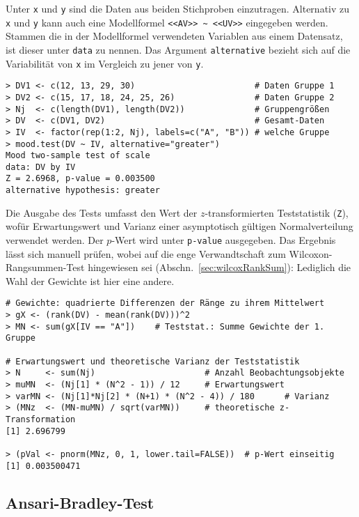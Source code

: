 Unter \lstinline!x! und \lstinline!y! sind die Daten aus beiden Stichproben einzutragen. Alternativ zu \lstinline!x! und \lstinline!y! kann auch eine Modellformel \lstinline!<<AV>> ~ <<UV>>! eingegeben werden. Stammen die in der Modellformel verwendeten Variablen aus einem Datensatz, ist dieser unter \lstinline!data! zu nennen. Das Argument \lstinline!alternative! bezieht sich auf die Variabilität von \lstinline!x! im Vergleich zu jener von \lstinline!y!.

\begin{lstlisting}
> DV1 <- c(12, 13, 29, 30)                        # Daten Gruppe 1
> DV2 <- c(15, 17, 18, 24, 25, 26)                # Daten Gruppe 2
> Nj  <- c(length(DV1), length(DV2))              # Gruppengrößen
> DV  <- c(DV1, DV2)                              # Gesamt-Daten
> IV  <- factor(rep(1:2, Nj), labels=c("A", "B")) # welche Gruppe
> mood.test(DV ~ IV, alternative="greater")
Mood two-sample test of scale
data: DV by IV
Z = 2.6968, p-value = 0.003500
alternative hypothesis: greater
\end{lstlisting}

Die Ausgabe des Tests umfasst den Wert der $z$-transformierten Teststatistik (\lstinline!Z!), wofür Erwartungswert und Varianz einer asymptotisch gültigen Normalverteilung verwendet werden. Der $p$-Wert wird unter \lstinline!p-value! ausgegeben. Das Ergebnis lässt sich manuell prüfen, wobei auf die enge Verwandtschaft zum Wilcoxon-Rangsummen-Test hingewiesen sei (Abschn.\ \ref{sec:wilcoxRankSum}): Lediglich die Wahl der Gewichte ist hier eine andere.
\begin{lstlisting}
# Gewichte: quadrierte Differenzen der Ränge zu ihrem Mittelwert
> gX <- (rank(DV) - mean(rank(DV)))^2
> MN <- sum(gX[IV == "A"])    # Teststat.: Summe Gewichte der 1. Gruppe

# Erwartungswert und theoretische Varianz der Teststatistik
> N     <- sum(Nj)                      # Anzahl Beobachtungsobjekte
> muMN  <- (Nj[1] * (N^2 - 1)) / 12     # Erwartungswert
> varMN <- (Nj[1]*Nj[2] * (N+1) * (N^2 - 4)) / 180      # Varianz
> (MNz  <- (MN-muMN) / sqrt(varMN))     # theoretische z-Transformation
[1] 2.696799

> (pVal <- pnorm(MNz, 0, 1, lower.tail=FALSE))  # p-Wert einseitig
[1] 0.003500471
\end{lstlisting}

\subsection{Ansari-Bradley-Test}

